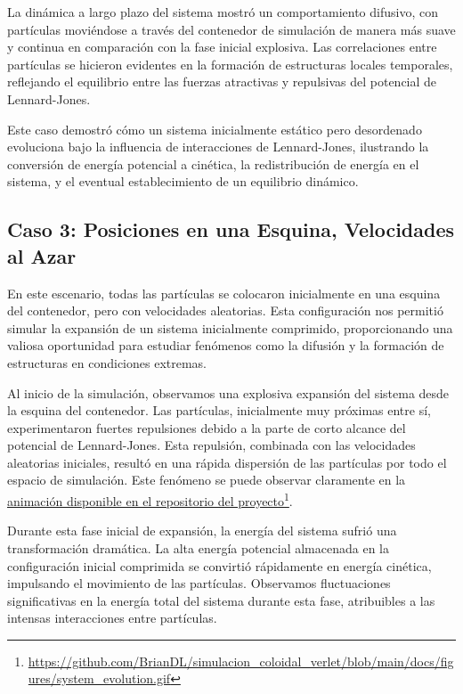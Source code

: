 \documentclass[twocolumn]{article}
\begin{document}
La dinámica a largo plazo del sistema mostró un comportamiento difusivo, con partículas moviéndose a través del contenedor de simulación de manera más suave y continua en comparación con la fase inicial explosiva. Las correlaciones entre partículas se hicieron evidentes en la formación de estructuras locales temporales, reflejando el equilibrio entre las fuerzas atractivas y repulsivas del potencial de Lennard-Jones.

Este caso demostró cómo un sistema inicialmente estático pero desordenado evoluciona bajo la influencia de interacciones de Lennard-Jones, ilustrando la conversión de energía potencial a cinética, la redistribución de energía en el sistema, y el eventual establecimiento de un equilibrio dinámico.

\subsection*{Caso 3: Posiciones en una Esquina, Velocidades al Azar}

En este escenario, todas las partículas se colocaron inicialmente en una esquina del contenedor, pero con velocidades aleatorias. Esta configuración nos permitió simular la expansión de un sistema inicialmente comprimido, proporcionando una valiosa oportunidad para estudiar fenómenos como la difusión y la formación de estructuras en condiciones extremas.


Al inicio de la simulación, observamos una explosiva expansión del sistema desde la esquina del contenedor. Las partículas, inicialmente muy próximas entre sí, experimentaron fuertes repulsiones debido a la parte de corto alcance del potencial de Lennard-Jones. Esta repulsión, combinada con las velocidades aleatorias iniciales, resultó en una rápida dispersión de las partículas por todo el espacio de simulación. Este fenómeno se puede observar claramente en la \href{https://github.com/BrianDL/simulacion_coloidal_verlet/blob/main/docs/figures/system_evolution.gif}{animación disponible en el repositorio del proyecto}\footnote{\url{https://github.com/BrianDL/simulacion_coloidal_verlet/blob/main/docs/figures/system_evolution.gif}}.

Durante esta fase inicial de expansión, la energía del sistema sufrió una transformación dramática. La alta energía potencial almacenada en la configuración inicial comprimida se convirtió rápidamente en energía cinética, impulsando el movimiento de las partículas. Observamos fluctuaciones significativas en la energía total del sistema durante esta fase, atribuibles a las intensas interacciones entre partículas. 
\end{document}
